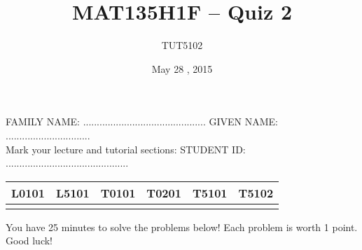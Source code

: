 \documentclass[10pt]{article}
\title{MAT135H1F -- Quiz 2}
\author{TUT5102}
\date{May 28 , 2015}
\begin{document}
\maketitle

FAMILY NAME: ............................................. \hspace{1 cm} GIVEN NAME: ............................... \\



Mark your lecture and tutorial sections: \hspace{1 cm}  STUDENT ID: ............................................. 
\begin{center}


\begin{tabular}{*{6}{|c}|} \hline
L0101 & L5101 & T0101 & T0201 & T5101 & T5102 \\ \hline
& & & & & \\  \hline
\end{tabular}
\end{center}

You have 25 minutes to solve the problems below! Each problem is worth 1 point. Good luck!

\begin{comment}
You have 10 minutes to record your solutions in the boxes below! Good luck!

\begin{center}
\begin{tabular}{*{5}{|c}|} \hline
 Question 1. &  Question 2. & Question 3. &  Question 4. & Question 5.  \\ \hline
&&&& \\ \hline
\end{tabular}
\end{center}
\end{comment}


\vspace{0.5 cm}
\end{document}
